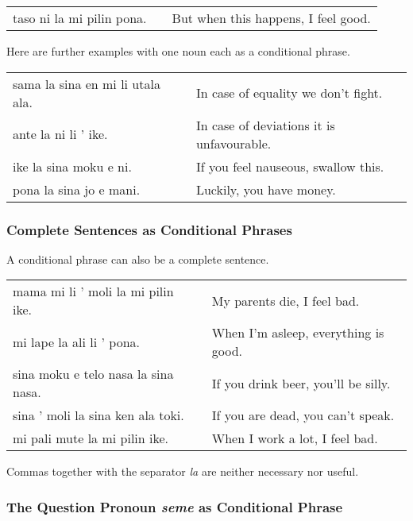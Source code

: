 \begin{supertabular}{p{5,5cm}|ll}
    taso ni la mi pilin pona. &  & But when this happens, I feel good. \\
\end{supertabular}

Here are further examples with one noun each as a conditional phrase.

\begin{supertabular}{p{5,5cm}|ll}
    sama la sina en mi li utala ala. &  & In case of equality we don't fight.       \\
    ante la ni li ' ike.             &  & In case of deviations it is unfavourable. \\
    ike la sina moku e ni.           &  & If you feel nauseous, swallow this.       \\
    pona la sina jo e mani.          &  & Luckily, you have money.                  \\
\end{supertabular}

\subsubsection*{Complete Sentences as Conditional Phrases}
A conditional phrase can also be a complete sentence.

\begin{supertabular}{p{5,5cm}|ll}
    mama mi li ' moli la mi pilin ike.  &  & My parents die, I feel bad.          \\
    mi lape la ali li ' pona.           &  & When I'm asleep, everything is good. \\
    sina moku e telo nasa la sina nasa. &  & If you drink beer, you'll be silly.  \\
    sina ' moli la sina ken ala toki.   &  & If you are dead, you can't speak.    \\
    mi pali mute la mi pilin ike.       &  & When I work a lot, I feel bad.       \\
\end{supertabular}

Commas together with the separator \textit{la} are neither necessary nor useful.

\subsubsection*{The Question Pronoun \textit{seme} as Conditional Phrase}

